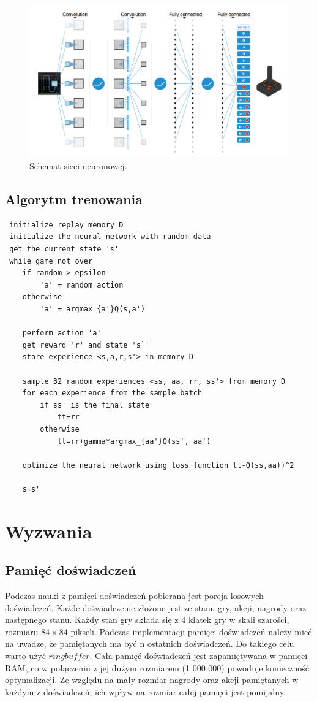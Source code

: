\documentclass[12pt]{article}
\begin{document}
\begin{figure}[H]
\centering \includegraphics[scale=0.3]{network.png}
\caption{Schemat sieci neuronowej. \cite{deepmind_2}}
\label{simple1}
\end{figure}

\subsection{Algorytm trenowania}

\begin{lstlisting}
 initialize replay memory D
 initialize the neural network with random data
 get the current state 's'
 while game not over
 	if random > epsilon 
 		'a' = random action
 	otherwise
 		'a' = argmax_{a'}Q(s,a')

	perform action 'a'
	get reward 'r' and state 's`'
	store experience <s,a,r,s'> in memory D
	
	sample 32 random experiences <ss, aa, rr, ss'> from memory D
	for each experience from the sample batch
		if ss' is the final state 
			tt=rr
		otherwise
			tt=rr+gamma*argmax_{aa'}Q(ss', aa')
	
	optimize the neural network using loss function tt-Q(ss,aa))^2
	
	s=s'
\end{lstlisting}

\newpage

\section{Wyzwania}
\subsection{Pamięć doświadczeń}
Podczas nauki z pamięci doświadczeń pobierana jest porcja losowych doświadczeń. Każde doświadczenie złożone jest ze stanu gry, akcji, nagrody oraz następnego stanu. Każdy stan gry składa się z 4 klatek gry w skali szarości, rozmiaru $84\times84$ pikseli. Podczas implementacji pamięci doświadczeń należy mieć na uwadze, że pamiętanych ma być n ostatnich doświadczeń. Do takiego celu warto użyć $ring buffer$. Cała pamięć doświadczeń jest zapamiętywana w pamięci RAM, co w połączeniu z jej dużym rozmiarem (1 000 000) powoduje konieczność optymalizacji. Ze względu na mały rozmiar nagrody oraz akcji pamiętanych w każdym z doświadczeń, ich wpływ na rozmiar całej pamięci jest pomijalny.
\end{document}
